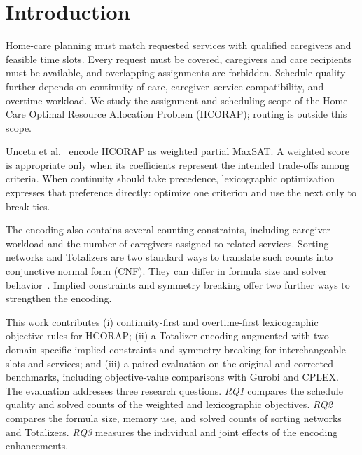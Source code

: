 \documentclass[sigconf,nonacm]{acmart}
\begin{document}
\section{Introduction}
\label{sec:introduction}

Home-care planning must match requested services with qualified caregivers and
feasible time slots.  Every request must be covered, caregivers and care
recipients must be available, and overlapping assignments are forbidden.
Schedule quality further depends on continuity of care, caregiver--service
compatibility, and overtime workload.  We study the assignment-and-scheduling
scope of the Home Care Optimal Resource Allocation Problem (HCORAP); routing is
outside this scope.

Unceta et al.~\cite{UncetaEtAl2024} encode HCORAP as weighted partial MaxSAT.\@
A weighted score is appropriate only when its coefficients represent the
intended trade-offs among criteria.  When continuity should take precedence,
lexicographic optimization expresses that preference directly: optimize one
criterion and use the next only to break ties.

The encoding also contains several counting constraints, including caregiver
workload and the number of caregivers assigned to related services.  Sorting
networks and Totalizers are two standard ways to translate such counts into
conjunctive normal form (CNF).  They can differ in formula size and solver
behavior~\cite{BailleuxBoufkhad2003,AsinEtAl2011}.  Implied constraints and
symmetry breaking offer two further ways to strengthen the encoding.

This work contributes (i) continuity-first and overtime-first lexicographic
objective rules for HCORAP; (ii) a Totalizer encoding augmented with two
domain-specific implied constraints and symmetry breaking for interchangeable
slots and services; and (iii) a paired evaluation on the original and corrected
benchmarks, including objective-value comparisons with Gurobi and CPLEX.\@
The evaluation addresses three research questions.  \emph{RQ1} compares the
schedule quality and solved counts of the weighted and
lexicographic objectives.  \emph{RQ2} compares the formula size, memory use, and
solved counts of sorting networks and Totalizers.  \emph{RQ3} measures the
individual and joint effects of the encoding enhancements.

\end{document}
